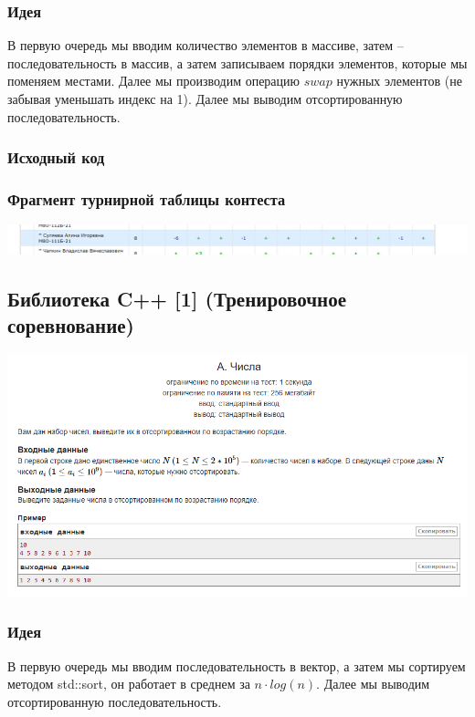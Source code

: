 \subsubsection*{Идея}
В первую очередь мы вводим количество элементов в массиве, затем -- последовательность в массив, а затем записываем порядки элементов, которые мы поменяем местами. Далее мы производим операцию $swap$ нужных элементов (не забывая уменьшать индекс на 1). Далее мы выводим отсортированную последовательность.
\subsubsection*{Исходный код}



\subsubsection*{Фрагмент турнирной таблицы контеста}
\begin{center} 
\includegraphics[scale=0.5]{standings/2.png}\newline\noindent
\end{center} 
\pagebreak

\subsection*{Библиотека C++ [1] (Тренировочное соревнование)}
\begin{center} 
\includegraphics[scale=0.75]{statements/3_A.png}
\end{center} 
\subsubsection*{Идея}
В первую очередь мы вводим последовательность в вектор, а затем мы сортируем методом std::sort, он работает в среднем за $n \cdot log(n)$. Далее мы выводим отсортированную последовательность.
